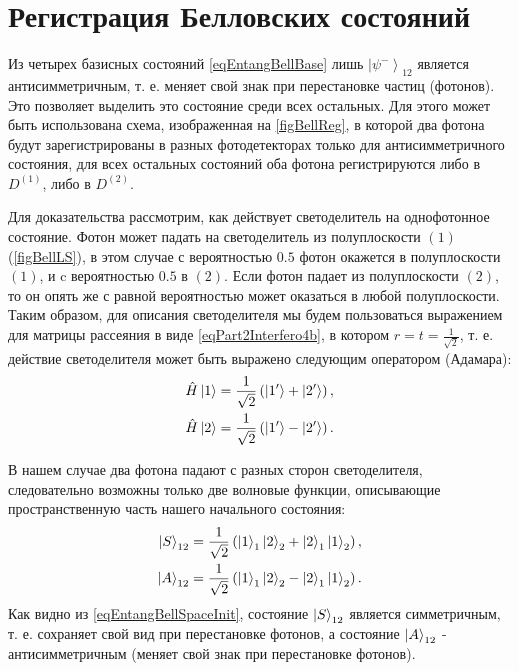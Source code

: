 \section{Регистрация Белловских состояний}
\label{pPart3EntangleBellReg}
Из четырех базисных состояний \eqref{eqEntangBellBase} лишь 
$\left|\psi^{-}\right>_{12}$ является антисимметричным, т. е. меняет
свой знак при перестановке частиц (фотонов). Это позволяет выделить
это состояние среди всех остальных. Для этого может быть использована
схема, изображенная на \autoref{figBellReg}, в которой два фотона
будут зарегистрированы в разных фотодетекторах только для
антисимметричного состояния, для всех остальных состояний оба фотона
регистрируются либо в $D^{(1)}$, либо в $D^{(2)}$.


 
Для доказательства рассмотрим, как действует светоделитель на однофотонное
состояние. Фотон может падать на светоделитель из полуплоскости
$\left(1\right)$ (\autoref{figBellLS}), в этом случае с вероятностью
$0.5$ фотон окажется в полуплоскости $\left(1\right)$, и c вероятностью
$0.5$ в $\left(2\right)$. Если фотон падает из полуплоскости
$\left(2\right)$, то он опять же с равной вероятностью может оказаться
в любой полуплоскости. 
Таким образом, для описания светоделителя мы будем пользоваться выражением
для матрицы рассеяния в виде \eqref{eqPart2Interfero4b}, в котором
$r=t=\frac{1}{\sqrt{2}}$, т. е. действие светоделителя может быть
выражено следующим оператором (Адамара\cite{bPhisQuantInfo}):
\begin{eqnarray}
\hat{H} \ket{1} = \frac{1}{\sqrt{2}}
\left(\ket{1'} +
\ket{2'}\right),
\nonumber \\
\hat{H} \ket{2} = \frac{1}{\sqrt{2}}\left(\ket{1'} -
\ket{2'}\right).
\label{eqEntangBellHadamar}
\end{eqnarray}

В нашем случае два фотона падают с разных сторон светоделителя,
следовательно возможны только две волновые функции, описывающие
пространственную часть нашего начального состояния:
\begin{eqnarray}
\ket{S}_{12} = \frac{1}{\sqrt{2}}\left(
\ket{1}_1\ket{2}_2 +
\ket{2}_1\ket{1}_2\right),
\nonumber \\
\ket{A}_{12} = \frac{1}{\sqrt{2}}\left(
\ket{1}_1\ket{2}_2 -
\ket{2}_1\ket{1}_2\right).
\label{eqEntangBellSpaceInit}
\end{eqnarray}
Как видно из \eqref{eqEntangBellSpaceInit}, состояние $\ket{S}_{12}$
является симметричным, т. е. сохраняет свой вид при перестановке
фотонов, а состояние $\ket{A}_{12}$ - антисимметричным (меняет свой
знак при перестановке фотонов).

